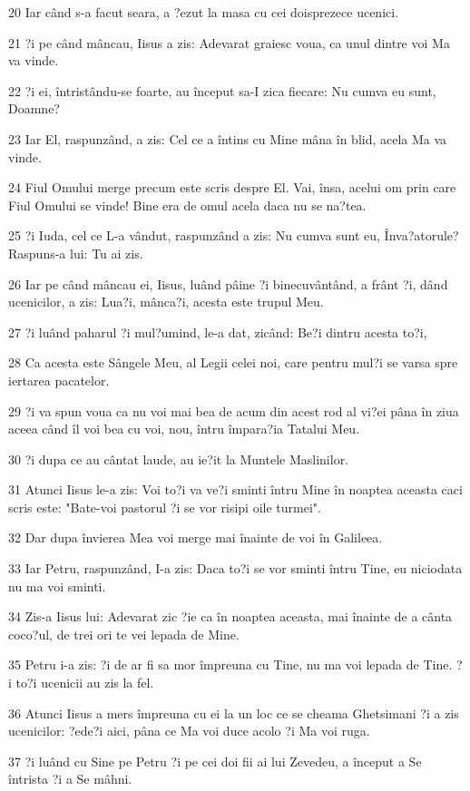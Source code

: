 \par 20 Iar când s-a facut seara, a ?ezut la masa cu cei doisprezece ucenici.
\par 21 ?i pe când mâncau, Iisus a zis: Adevarat graiesc voua, ca unul dintre voi Ma va vinde.
\par 22 ?i ei, întristându-se foarte, au început sa-I zica fiecare: Nu cumva eu sunt, Doamne?
\par 23 Iar El, raspunzând, a zis: Cel ce a întins cu Mine mâna în blid, acela Ma va vinde.
\par 24 Fiul Omului merge precum este scris despre El. Vai, însa, acelui om prin care Fiul Omului se vinde! Bine era de omul acela daca nu se na?tea.
\par 25 ?i Iuda, cel ce L-a vândut, raspunzând a zis: Nu cumva sunt eu, Înva?atorule? Raspuns-a lui: Tu ai zis.
\par 26 Iar pe când mâncau ei, Iisus, luând pâine ?i binecuvântând, a frânt ?i, dând ucenicilor, a zis: Lua?i, mânca?i, acesta este trupul Meu.
\par 27 ?i luând paharul ?i mul?umind, le-a dat, zicând: Be?i dintru acesta to?i,
\par 28 Ca acesta este Sângele Meu, al Legii celei noi, care pentru mul?i se varsa spre iertarea pacatelor.
\par 29 ?i va spun voua ca nu voi mai bea de acum din acest rod al vi?ei pâna în ziua aceea când îl voi bea cu voi, nou, întru împara?ia Tatalui Meu.
\par 30 ?i dupa ce au cântat laude, au ie?it la Muntele Maslinilor.
\par 31 Atunci Iisus le-a zis: Voi to?i va ve?i sminti întru Mine în noaptea aceasta caci scris este: "Bate-voi pastorul ?i se vor risipi oile turmei".
\par 32 Dar dupa învierea Mea voi merge mai înainte de voi în Galileea.
\par 33 Iar Petru, raspunzând, I-a zis: Daca to?i se vor sminti întru Tine, eu niciodata nu ma voi sminti.
\par 34 Zis-a Iisus lui: Adevarat zic ?ie ca în noaptea aceasta, mai înainte de a cânta coco?ul, de trei ori te vei lepada de Mine.
\par 35 Petru i-a zis: ?i de ar fi sa mor împreuna cu Tine, nu ma voi lepada de Tine. ?i to?i ucenicii au zis la fel.
\par 36 Atunci Iisus a mers împreuna cu ei la un loc ce se cheama Ghetsimani ?i a zis ucenicilor: ?ede?i aici, pâna ce Ma voi duce acolo ?i Ma voi ruga.
\par 37 ?i luând cu Sine pe Petru ?i pe cei doi fii ai lui Zevedeu, a început a Se întrista ?i a Se mâhni.
